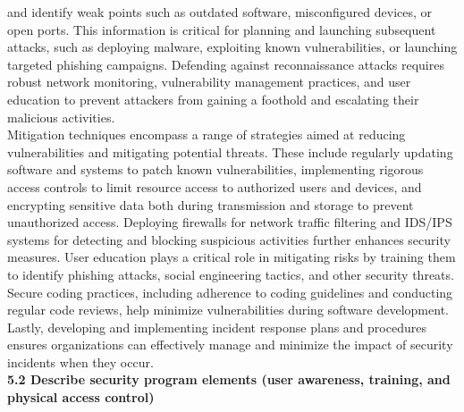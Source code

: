 \documentclass{article}
\begin{document}
and identify weak points such as outdated software, misconfigured devices, or open ports. This information is critical for planning and launching subsequent attacks, such as deploying malware, exploiting known vulnerabilities, or launching targeted phishing campaigns. Defending against reconnaissance attacks requires robust network monitoring, vulnerability management practices, and user education to prevent attackers from gaining a foothold and escalating their malicious activities.\\
	
	Mitigation techniques encompass a range of strategies aimed at reducing vulnerabilities and mitigating potential threats. These include regularly updating software and systems to patch known vulnerabilities, implementing rigorous access controls to limit resource access to authorized users and devices, and encrypting sensitive data both during transmission and storage to prevent unauthorized access. Deploying firewalls for network traffic filtering and IDS/IPS systems for detecting and blocking suspicious activities further enhances security measures. User education plays a critical role in mitigating risks by training them to identify phishing attacks, social engineering tactics, and other security threats. Secure coding practices, including adherence to coding guidelines and conducting regular code reviews, help minimize vulnerabilities during software development. Lastly, developing and implementing incident response plans and procedures ensures organizations can effectively manage and minimize the impact of security incidents when they occur.\\
  
\noindent\textbf{5.2 Describe security program elements (user awareness, training, and physical access control)}\\
\end{document}
